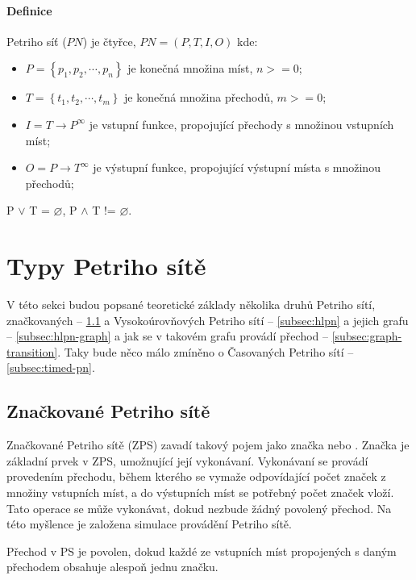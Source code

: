 \paragraph{Definice}

Petriho síť ($PN$) je čtyřce, $PN = \left(P, T, I, O\right)$ kde:
  \begin{itemize}
    \item $P = \left\{p_1, p_2, \cdots , p_n\right\}$ je konečná množina míst, $n >= 0$; \\
    \item $T = \left\{t_1, t_2, \cdots , t_m\right\}$ je konečná množina přechodů, $m >= 0$; \\
    \item $I = T \rightarrow P^\infty$ je vstupní funkce, propojující přechody s množinou vstupních míst; \\
    \item $O = P \rightarrow T^\infty$ je výstupní funkce, propojující výstupní místa s množinou přechodů; \\
  \end{itemize}
P $\vee$ T = $\varnothing$, P $\wedge$ T != $\varnothing$.

\section{Typy Petriho sítě}

V této sekci budou popsané teoretické základy několika druhů Petriho sítí, značkovaných -- \ref{subsec:marked-pn} a Vysokoúrovňových Petriho sítí -- \ref{subsec:hlpn} a jejich grafu -- \ref{subsec:hlpn-graph} a jak se v takovém grafu provádí přechod -- \ref{subsec:graph-transition}. Taky bude něco málo zmíněno o Časovaných Petriho sítí -- \ref{subsec:timed-pn}.

\subsection{Značkované Petriho sítě}
\label{subsec:marked-pn}
Značkované Petriho sítě (ZPS) zavadí takový pojem jako značka nebo . Značka je základní prvek v ZPS, umožnující její vykonávaní. Vykonávaní se provádí provedením přechodu, během kterého se vymaže odpovídající počet značek z množiny vstupních míst, a do výstupních míst se potřebný počet značek vloží. Tato operace se může vykonávat, dokud nezbude žádný povolený přechod. Na této myšlence je založena simulace provádění Petriho sítě.

Přechod v PS je povolen, dokud každé ze vstupních míst propojených s daným přechodem obsahuje alespoň jednu značku.

